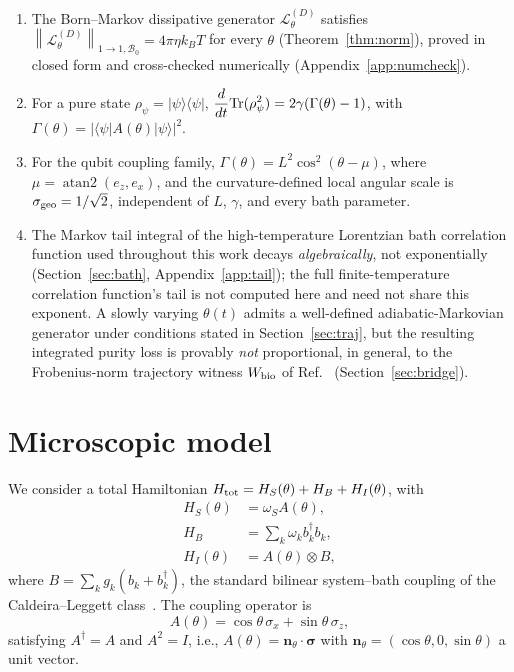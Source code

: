 \documentclass[aps,pra,reprint,superscriptaddress,nofootinbib,longbibliography]{revtex4-2}
\newcommand{\Bzero}{\mathcal{B}_0}
\newcommand{\supnorm}[1]{\left\|#1\right\|_{1\rightarrow1,\Bzero}}
\newcommand{\Wbio}{W_{\rm bio}}
\begin{document}
\begin{enumerate}
\item The Born--Markov dissipative generator
$\mathcal{L}^{(D)}_\theta$ satisfies
$\supnorm{\mathcal{L}^{(D)}_\theta}=4\pi\eta k_BT$ for every
$\theta$ (Theorem~\ref{thm:norm}), proved in closed form and
cross-checked numerically (Appendix~\ref{app:numcheck}).

\item For a pure state $\rho_\psi=|\psi\rangle\langle\psi|$,
$\displaystyle \frac{d}{dt}{\rm Tr}(\rho_\psi^2)=2\gamma(\Gamma(\theta)-1)$,
with $\Gamma(\theta)=|\langle\psi|A(\theta)|\psi\rangle|^2$.

\item For the qubit coupling family,
$\Gamma(\theta)=L^2\cos^2(\theta-\mu)$,
where $\mu=\operatorname{atan2}(e_z,e_x)$, and the curvature-defined
local angular scale is $\sigma_{\rm geo}=1/\sqrt{2}$, independent of
$L$, $\gamma$, and every bath parameter.

\item The Markov tail integral of the high-temperature Lorentzian bath
correlation function used throughout this work decays
\emph{algebraically}, not exponentially (Section~\ref{sec:bath},
Appendix~\ref{app:tail}); the full finite-temperature correlation
function's tail is not computed here and need not share this exponent.
A slowly varying
$\theta(t)$ admits a well-defined adiabatic-Markovian generator under
conditions stated in Section~\ref{sec:traj}, but the resulting
integrated purity loss is provably \emph{not} proportional, in
general, to the Frobenius-norm trajectory witness $\Wbio$ of
Ref.~\cite{rodrigues2025} (Section~\ref{sec:bridge}).
\end{enumerate}

\section{Microscopic model}
\label{sec:model}

We consider a total Hamiltonian
$H_{\rm tot}=H_S(\theta)+H_B+H_I(\theta)$,
with
\begin{align}
H_S(\theta) &= \omega_S A(\theta), \label{eq:HS}\\
H_B &= \sum_k \omega_k b_k^\dagger b_k, \label{eq:HB}\\
H_I(\theta) &= A(\theta)\otimes B, \label{eq:Hint}
\end{align}
where $B=\sum_k g_k(b_k+b_k^\dagger)$, the standard bilinear
system--bath coupling of the Caldeira--Leggett
class~\cite{caldeira1983path}. The coupling operator is
\begin{equation}
A(\theta)=\cos\theta\,\sigma_x+\sin\theta\,\sigma_z,
\label{eq:Atheta}
\end{equation}
satisfying $A^\dagger=A$ and $A^2=I$, i.e., $A(\theta)=\mathbf{n}_\theta\cdot\boldsymbol\sigma$
with $\mathbf{n}_\theta=(\cos\theta,0,\sin\theta)$ a unit vector.
\end{document}
